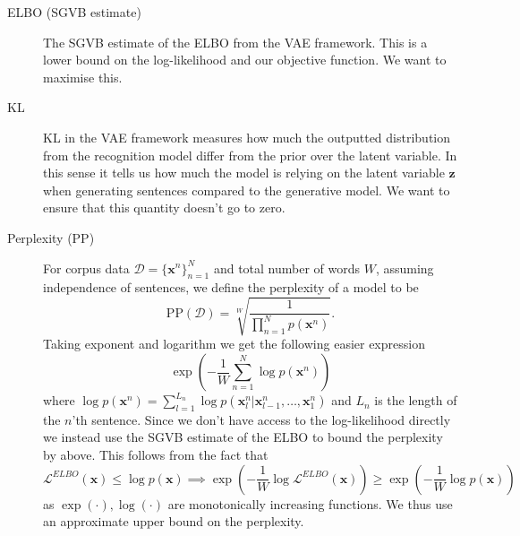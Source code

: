 \begin{description}
\item[ELBO (SGVB estimate)]
  The SGVB estimate of the ELBO from the VAE framework. This is a lower bound on
  the log-likelihood and our objective function. We want to maximise this.
\item[KL]
  KL in the VAE framework measures how much the outputted distribution from the
  recognition model differ from the prior over the latent variable. In this
  sense it tells us how much the model is relying on the latent variable
  $\bm{z}$ when generating sentences compared to the generative model. We want
  to ensure that this quantity doesn't go to zero.
\item[Perplexity (PP)]
  For corpus data $\mathcal{D} = \{\bm{x}^n\}_{n=1}^N$ and total number of
  words $W$, assuming independence of sentences, we define the perplexity of a model to be
  \begin{equation}
    \label{eq:perplexity}
    \text{PP}(\mathcal{D}) = \sqrt[W]{\frac{1}{\prod_{n=1}^Np(\bm{x}^n)}}.
  \end{equation}
  Taking exponent and logarithm we get the following easier expression
  \begin{equation}
    \label{eq:perplexity_exp_log}
    \exp(-\frac{1}{W}\sum_{n=1}^N \log p(\bm{x}^n))
  \end{equation}
  where $\log p(\bm{x}^n) = \sum_{l = 1}^{L_n} \log p(\bm{x}^n_{l} |
  \bm{x}^n_{l-1}, \dots, \bm{x}^n_{1})$ and $L_n$ is the length of the $n$'th sentence. Since we don't have access to the
  log-likelihood directly we instead use the SGVB estimate of the ELBO to bound
  the perplexity by above. This follows from the fact that
  \begin{equation*}
    \mathcal{L}^{ELBO}(\bm{x}) \leq \log p(\bm{x}) \implies \exp(-\frac{1}{W}\log \mathcal{L}^{ELBO}(\bm{x})) \geq \exp(-\frac{1}{W} \log p(\bm{x}))
  \end{equation*}
  as $\exp(\cdot), \log(\cdot)$ are monotonically increasing functions. We thus
  use an approximate upper bound on the perplexity.
\end{description}

